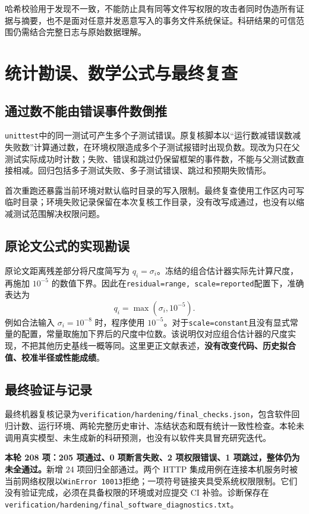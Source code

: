 \documentclass[UTF8,a4paper,zihao=-4,fontset=none]{ctexart}
\newcommand{\code}[1]{{\small\nolinkurl{#1}}}
\begin{document}
哈希校验用于发现不一致，不能防止具有同等文件写权限的攻击者同时伪造所有证据与摘要，也不是面对任意并发恶意写入的事务文件系统保证。科研结果的可信范围仍需结合完整日志与原始数据理解。

\newpage
\section{统计勘误、数学公式与最终复查}
\subsection{通过数不能由错误事件数倒推}
\code{unittest}中的同一测试可产生多个子测试错误。原复核脚本以“运行数减错误数减失败数”计算通过数，在环境权限造成多个子测试报错时出现负数。现改为只在父测试实际成功时计数；失败、错误和跳过仍保留框架的事件数，不能与父测试数直接相减。回归包括多子测试失败、多子测试错误、跳过和预期失败情形。

首次重跑还暴露当前环境对默认临时目录的写入限制。最终复查使用工作区内可写临时目录；环境失败记录保留在本次复核工作目录，没有改写成通过，也没有以缩减测试范围解决权限问题。

\subsection{原论文公式的实现勘误}
原论文距离残差部分将尺度简写为 $q_i=\sigma_i$。冻结的组合估计器实际先计算尺度，再施加 $10^{-5}$ 的数值下界。因此在\code{residual=range, scale=reported}配置下，准确表达为
\[
q_i=\max(\sigma_i,10^{-5}).
\]
例如合法输入 $\sigma_i=10^{-8}$ 时，程序使用 $10^{-5}$。对于\code{scale=constant}且没有显式常量的配置，常量取施加下界后的尺度中位数。该说明仅对应组合估计器的尺度实现，不把其他历史基线一概等同。这里更正文献表述，\textbf{没有改变代码、历史拟合值、校准半径或性能成绩}。

\subsection{最终验证与记录}
最终机器复核记录为\code{verification/hardening/final_checks.json}，包含软件回归计数、运行环境、两轮完整历史审计、冻结状态和既有统计一致性检查。本轮未调用真实模型、未生成新的科研预测，也没有以软件夹具冒充研究迭代。

\textbf{本轮 208 项：205 项通过、0 项断言失败、2 项权限错误、1 项跳过，整体仍为未全通过。}新增 24 项回归全部通过。两个 HTTP 集成用例在连接本机服务时被当前网络权限以\code{WinError 10013}拒绝；一项符号链接夹具受系统权限限制。它们没有验证完成，必须在具备权限的环境或对应提交 CI 补验。诊断保存在\code{verification/hardening/final_software_diagnostics.txt}。
\end{document}
